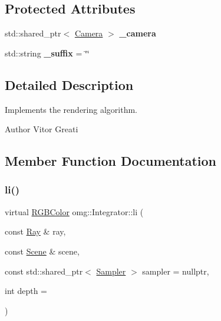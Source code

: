 \subsection*{Protected Attributes}
\begin{DoxyCompactItemize}
\item 
\mbox{\label{classomg_1_1_integrator_ad29a31e12c27836dce0212eec56db17b}} 
std\+::shared\+\_\+ptr$<$ \mbox{\hyperlink{classomg_1_1_camera}{Camera}} $>$ {\bfseries \+\_\+camera}
\item 
\mbox{\label{classomg_1_1_integrator_a4b7b411dd0432d9732415e4a780f1a00}} 
std\+::string {\bfseries \+\_\+suffix} = \char`\"{}\char`\"{}
\end{DoxyCompactItemize}


\subsection{Detailed Description}
Implements the rendering algorithm. 

\begin{DoxyAuthor}{Author}
Vitor Greati 
\end{DoxyAuthor}


\subsection{Member Function Documentation}
\mbox{\label{classomg_1_1_integrator_a2922583794310f6b1ff8ee121666f7a1}} 
\subsubsection{\texorpdfstring{li()}{li()}}
{\footnotesize\ttfamily virtual \mbox{\hyperlink{namespaceomg_a7b0e3f3dcf76f2b4758c314a41885917}{R\+G\+B\+Color}} omg\+::\+Integrator\+::li (\begin{DoxyParamCaption}\item[{const \mbox{\hyperlink{classomg_1_1_ray}{Ray}} \&}]{ray,  }\item[{const \mbox{\hyperlink{classomg_1_1_scene}{Scene}} \&}]{scene,  }\item[{const std\+::shared\+\_\+ptr$<$ \mbox{\hyperlink{classomg_1_1_sampler}{Sampler}} $>$}]{sampler = {\ttfamily nullptr},  }\item[{int}]{depth = {} }\end{DoxyParamCaption})\hspace{0.3cm}{\ttfamily [pure virtual]}}



